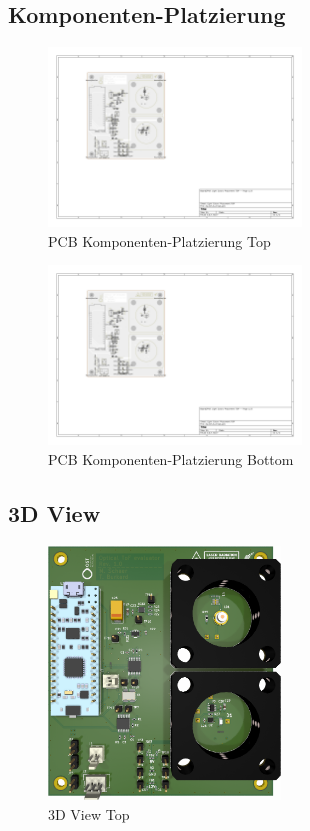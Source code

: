 \subsection{Komponenten-Platzierung}\label{sec:apdx_placement}

\begin{figure}[H]
    \centering
    \includegraphics[page=1, trim=120 220 450 80, clip, width=0.6\textwidth]{attachments/pcb_placement.pdf}
    \caption{PCB Komponenten-Platzierung Top}\label{fig:apdx_pcb_placement_1}
\end{figure}

\begin{figure}[H]
    \centering
    \includegraphics[page=2, trim=450 220 120 80, clip, width=0.6\textwidth]{attachments/pcb_placement.pdf}
    \caption{PCB Komponenten-Platzierung Bottom}\label{fig:apdx_pcb_placement_2}
\end{figure}
\pagebreak

\subsection{3D View}\label{sec:apdx_3D_view}

\begin{figure}[H]
    \centering
    \includegraphics[width=0.55\textwidth]{graphics/3d_top.png}
    \caption{3D View Top}\label{fig:apdx_3d_top}
\end{figure}

